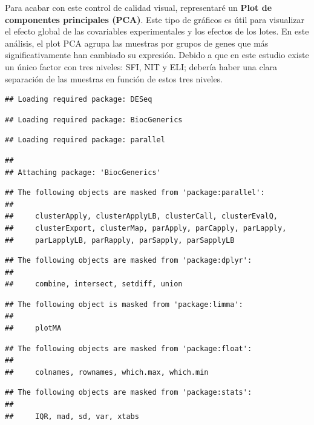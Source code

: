 \documentclass[]{article}
\begin{document}
Para acabar con este control de calidad visual, representaré un
\textbf{Plot de componentes principales (PCA)}. Este tipo de gráficos es
útil para visualizar el efecto global de las covariables experimentales
y los efectos de los lotes. En este análisis, el plot PCA agrupa las
muestras por grupos de genes que más significativamente han cambiado su
expresión. Debido a que en este estudio existe un único factor con tres
niveles: SFI, NIT y ELI; debería haber una clara separación de las
muestras en función de estos tres niveles.

\begin{verbatim}
## Loading required package: DESeq
\end{verbatim}

\begin{verbatim}
## Loading required package: BiocGenerics
\end{verbatim}

\begin{verbatim}
## Loading required package: parallel
\end{verbatim}

\begin{verbatim}
## 
## Attaching package: 'BiocGenerics'
\end{verbatim}

\begin{verbatim}
## The following objects are masked from 'package:parallel':
## 
##     clusterApply, clusterApplyLB, clusterCall, clusterEvalQ,
##     clusterExport, clusterMap, parApply, parCapply, parLapply,
##     parLapplyLB, parRapply, parSapply, parSapplyLB
\end{verbatim}

\begin{verbatim}
## The following objects are masked from 'package:dplyr':
## 
##     combine, intersect, setdiff, union
\end{verbatim}

\begin{verbatim}
## The following object is masked from 'package:limma':
## 
##     plotMA
\end{verbatim}

\begin{verbatim}
## The following objects are masked from 'package:float':
## 
##     colnames, rownames, which.max, which.min
\end{verbatim}

\begin{verbatim}
## The following objects are masked from 'package:stats':
## 
##     IQR, mad, sd, var, xtabs
\end{verbatim}
\end{document}
